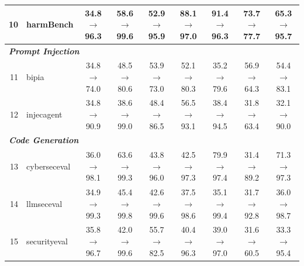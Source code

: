 \begin{table}[t]
{\begin{tabular}{rl c c c c c c c}
10 & harmBench & 34.8$\rightarrow$96.3 & 58.6$\rightarrow$99.6 & 52.9$\rightarrow$95.9 & 88.1$\rightarrow$97.0 & 91.4$\rightarrow$96.3 & 73.7$\rightarrow$77.7 & 65.3$\rightarrow$95.7 \\
\midrule
\multicolumn{9}{l}{\textit{\textbf{Prompt Injection}}} \\
11 & bipia & 34.8$\rightarrow$74.0 & 48.5$\rightarrow$80.6 & 53.9$\rightarrow$73.0 & 52.1$\rightarrow$80.3 & 35.2$\rightarrow$79.6 & 56.9$\rightarrow$64.3 & 54.4$\rightarrow$83.1 \\
12 & injecagent & 34.8$\rightarrow$90.9 & 38.6$\rightarrow$99.0 & 48.4$\rightarrow$86.5 & 56.5$\rightarrow$93.1 & 38.4$\rightarrow$94.5 & 31.8$\rightarrow$63.4 & 32.1$\rightarrow$90.0 \\
\midrule
\multicolumn{9}{l}{\textit{\textbf{Code Generation}}} \\
13 & cyberseceval & 36.0$\rightarrow$98.1 & 63.6$\rightarrow$99.3 & 43.8$\rightarrow$96.0 & 42.5$\rightarrow$97.3 & 79.9$\rightarrow$97.4 & 31.4$\rightarrow$89.2 & 71.3$\rightarrow$97.3 \\
14 & llmseceval & 34.9$\rightarrow$99.3 & 45.4$\rightarrow$99.8 & 42.6$\rightarrow$99.6 & 37.5$\rightarrow$98.6 & 35.1$\rightarrow$99.4 & 31.7$\rightarrow$92.8 & 36.0$\rightarrow$98.7 \\
15 & securityeval & 35.8$\rightarrow$96.7 & 42.0$\rightarrow$99.6 & 55.7$\rightarrow$82.5 & 40.4$\rightarrow$96.3 & 39.0$\rightarrow$97.0 & 31.6$\rightarrow$60.5 & 33.3$\rightarrow$95.4 \\
\bottomrule
\end{tabular}
}
\end{table}